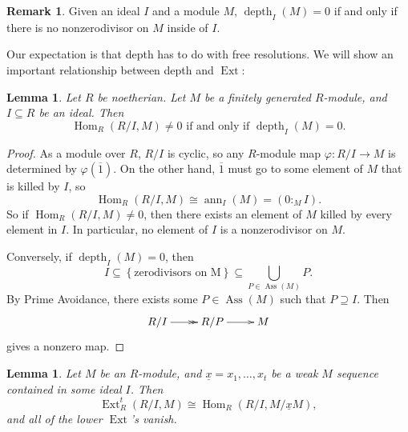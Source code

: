 \documentclass[11pt]{book}
\newtheorem{lemma}[theorem]{Lemma}
\numberwithin{equation}{section}
\numberwithin{theorem}{chapter}
\theoremstyle{definition}
\newtheorem*{basic properties}{Basic Properties}
\newtheorem*{Important Remark}{Important Remark}
\newtheorem{remark}[theorem]{Remark}
\theoremstyle{remark}
\newcommand{\Hom}{\operatorname{Hom}}
\newcommand{\Ext}{\operatorname{Ext}}
\newcommand{\Ass}{\operatorname{Ass}}
\newcommand{\ann}{\operatorname{ann}}
\newcommand{\depth}{\operatorname{depth}}
\begin{document}
\begin{remark}
	Given an ideal $I$ and a module $M$, $\depth_I(M) = 0$ if and only if there is no nonzerodivisor on $M$ inside of $I$.
\end{remark}

Our expectation is that depth has to do with free resolutions. We will show an important relationship between depth and $\Ext$:

\begin{lemma}\label{lemma-Hom-zero}
	Let $R$ be noetherian. Let $M$ be a finitely generated $R$-module, and $I \subseteq R$ be an ideal. Then
	$$\Hom_R \left( R/I , M \right) \neq 0 \textrm{ if and only if } \depth_I(M) = 0.$$
\end{lemma}

\begin{proof}
	As a module over $R$, $R/I$ is cyclic, so any $R$-module map $\varphi: R/I \longrightarrow M$ is determined by $\varphi(\overline{1})$. On the other hand, $\overline{1}$ must go to some element of $M$ that is killed by $I$, so
	$$\Hom_R \left( R/I , M \right) \cong \ann_I(M) = (0 :_M I).$$
	So if $\Hom_R \left( R/I , M \right) \not= 0$, then there exists an element of $M$ killed by every element in $I$. In particular, no element of $I$ is a nonzerodivisor on $M$.
	
	Conversely, if $\depth_I(M) = 0$, then
	$$I \subseteq \left\lbrace \textrm{zerodivisors on M} \right\rbrace \subseteq \bigcup_{P \in \Ass(M)} P.$$
	By Prime Avoidance, there exists some $P \in \Ass(M)$ such that $P \supseteq I$. Then
	$$\xymatrix{R/I \ar@{->>}[r] & R/P \ar[r] & M}$$
	gives a nonzero map.
\end{proof}


\begin{lemma}\label{lemma ext to hom}
	Let $M$ be an $R$-module, and $\underline{x} = x_1, \ldots, x_t$ be a weak $M$ sequence contained in some ideal $I$. Then
	$$\Ext^t_R (R/I, M) \cong \Hom_R(R/I, M/\underline{x}M),$$
 and all of the lower $\Ext$'s vanish.	
\end{lemma}
\end{document}
